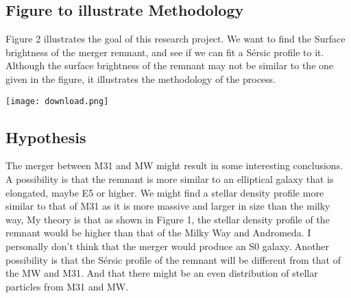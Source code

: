 \documentclass[linenumbers, preprint, times]{aastex631}
\begin{document}
\subsection{Figure to illustrate Methodology}
\par
Figure 2 illustrates the goal of this research project. We want to find the Surface brightness of the merger remnant, and see if we can fit a Sérsic profile to it. Although the surface brightness of the remnant may not be similar to the one given in the figure, it illustrates the methodology of the process.
\begin{center}
\texttt{[image: download.png]}%
\label{labelname}%
\end{center}
\par
\subsection{Hypothesis}
The merger between M31 and MW might result in some interesting conclusions. A possibility is that the remnant is more similar to an elliptical galaxy that is elongated, maybe E5 or higher. We might find a stellar density profile more similar to that of M31 as it is more massive and larger in size than the milky way, My theory is that as shown in Figure 1, the stellar density profile of the remnant would be higher than that of the Milky Way and Andromeda. I personally don't think that the merger would produce an S0 galaxy. Another possibility is that the Sérsic profile of the remnant will be different from that of the MW and M31. And that there might be an even distribution of stellar particles from M31 and MW.

\nolinenumbers
{}

\end{document}
